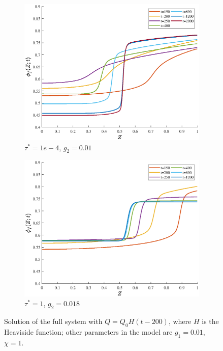 \documentclass[12pt]{extarticle}
\begin{document}
\begin{figure}[h]
	\hspace{-5mm}
	\begin{subfigure}{0.49\textwidth}
		\hspace{3mm}
		\includegraphics[scale=0.32]{images/transient_flux3}
		\caption{$\tau^*=1e-4$, $g_2=0.01$}
	\end{subfigure}
	\hspace{10mm}
	\begin{subfigure}{0.49\textwidth}
		\includegraphics[scale=0.32]{images/transient_flux2}
		\caption{$\tau^*=1$, $g_2=0.018$}
	\end{subfigure}
	\caption{Solution of the full system with $Q=Q_0 H(t-200)$, where $H$ is the Heaviside function; other parameters in the model are $g_1=0.01$, $\chi=1$.}
\end{figure}
\end{document}
